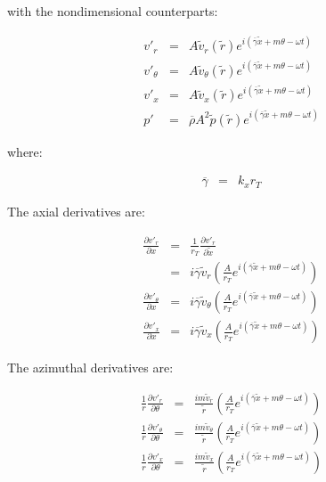 \documentclass[12pt]{article}
\begin{document}
with the nondimensional counterparts:

\begin{eqnarray}
v'_r &=& A \widetilde{v}_r \left(\widetilde{r} \right) e^{i \left(\overline{\gamma} \widetilde{x} + m \theta - \omega t \right)}
\nonumber
\\
v'_{\theta} &=& A \widetilde{v}_{\theta} \left(\widetilde{r} \right) e^{i \left(\overline{\gamma} \widetilde{x} + m \theta - \omega t \right)}
\nonumber
\\
v'_x &=& A \widetilde{v}_x \left(\widetilde{r} \right) e^{i \left(\overline{\gamma} \widetilde{x} + m \theta - \omega t \right)}
\nonumber
\\
p' &=& \overline{\rho} A^2 \widetilde{p} \left(\widetilde{r} \right) 
e^{i \left(\overline{\gamma} \widetilde{x} + m \theta - \omega t \right)}
\nonumber
\end{eqnarray}

where:

\begin{eqnarray}
\overline{\gamma} &=& k_x r_T
\nonumber
\end{eqnarray}

The axial derivatives are:

\begin{eqnarray}
\frac{\partial v'_r}{\partial x}
&=&
\frac{1}{r_T}
\frac{\partial v'_r}{\partial \widetilde{x}}
\nonumber
\\
&=&
i \overline{\gamma} \widetilde{v}_r
\left(
\frac{A}{r_T}
e^{i \left(\overline{\gamma} \widetilde{x} + m \theta - \omega t \right)}
\right)
\nonumber
\\
\frac{\partial v'_{\theta}}{\partial x}
&=&
i \overline{\gamma} \widetilde{v}_{\theta}
\left(
\frac{A}{r_T}
e^{i \left(\overline{\gamma} \widetilde{x} + m \theta - \omega t \right)}
\right)
\nonumber
\\
\frac{\partial v'_x}{\partial x}
&=&
i \overline{\gamma} \widetilde{v}_x
\left(
\frac{A}{r_T}
e^{i \left(\overline{\gamma} \widetilde{x} + m \theta - \omega t \right)}
\right)
\nonumber
\end{eqnarray}

The azimuthal derivatives are:

\begin{eqnarray}
\frac{1}{r}
\frac{\partial v'_r}{\partial \theta}
&=&
\frac{i m \widetilde{v}_r}{\widetilde{r}}
\left(
\frac{A}{r_T}
e^{i \left(\overline{\gamma} \widetilde{x} + m \theta - \omega t \right)}
\right)
\nonumber
\\
\frac{1}{r}
\frac{\partial v'_{\theta}}{\partial \theta}
&=&
\frac{i m \widetilde{v}_{\theta}}{\widetilde{r}}
\left(
\frac{A}{r_T}
e^{i \left(\overline{\gamma} \widetilde{x} + m \theta - \omega t \right)}
\right)
\nonumber
\\
\frac{1}{r}
\frac{\partial v'_x}{\partial \theta}
&=&
\frac{i m \widetilde{v}_x}{\widetilde{r}}
\left(
\frac{A}{r_T}
e^{i \left(\overline{\gamma} \widetilde{x} + m \theta - \omega t \right)}
\right)
\nonumber
\end{eqnarray}
\end{document}
